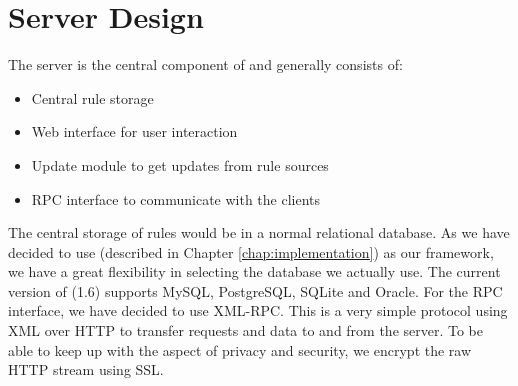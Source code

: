 \section{Server Design}

The server is the central component of \snowman{} and generally consists of:

\begin{itemize}
  \item Central rule storage
  \item Web interface for user interaction
  \item Update module to get updates from rule sources
  \item RPC interface to communicate with the clients 
\end{itemize}

The central storage of rules would be in a normal relational database. As we
have decided to use \django{} (described in Chapter \ref{chap:implementation})
as our framework, we have a great flexibility in selecting the database we actually
use. The current version of \django{} (1.6) supports MySQL,
PostgreSQL, SQLite and Oracle. For the RPC interface, we have decided to use
XML-RPC. This is a very simple protocol using XML over HTTP to transfer 
requests and data to and from the server. To be able to keep up with the aspect
of privacy and security, we encrypt the raw HTTP stream using SSL. 






